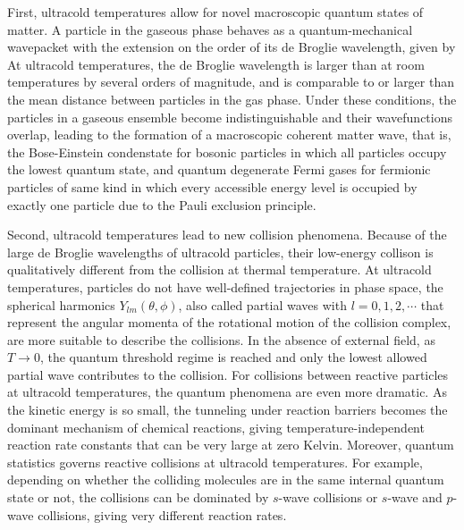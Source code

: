 First, ultracold temperatures allow for novel macroscopic quantum states of matter. A particle in the gaseous phase behaves as a quantum-mechanical 
wavepacket with the extension on the order of its de Broglie wavelength, given by
At ultracold temperatures, the de Broglie wavelength is larger than at room temperatures by several orders of magnitude, 
and is comparable to or larger than the mean distance between particles in the gas phase. Under these conditions,
the particles in a gaseous ensemble become indistinguishable and their wavefunctions overlap, leading to the formation of
a macroscopic coherent matter wave, that is, the Bose-Einstein condenstate\cite{ketterle2002, anglin2002} for bosonic 
particles in which all particles occupy the lowest quantum state, and quantum degenerate Fermi gases\cite{lev2002, stefano2008} for fermionic 
particles of same kind in which every accessible energy level is occupied by exactly one particle due to the Pauli exclusion principle. 

Second, ultracold temperatures lead to new collision phenomena.
Because of the large de Broglie wavelengths of ultracold particles, their low-energy collison is 
qualitatively different from the collision at thermal temperature. At ultracold temperatures, particles
do not have well-defined trajectories in phase space, the spherical harmonics $Y_{lm}(\theta, \phi)$, also called 
partial waves with $l = 0, 1, 2, \cdots$ that represent the angular momenta of the rotational motion of the collision complex,  are more suitable to describe the collisions. In the absence of external field, as $T 
\rightarrow 0$, the quantum threshold regime is reached and only the lowest allowed partial wave contributes to the 
collision\cite{wigner1948, krems2005}. For collisions between reactive particles at ultracold temperatures, the quantum phenomena are
even more dramatic. As the kinetic energy is so small, the tunneling under reaction barriers becomes the 
dominant mechanism of chemical reactions, giving temperature-independent reaction rate constants that 
can be very large at zero Kelvin\cite{balakrishnan2001, bodo2002, bodo2004, weck2004}. Moreover, quantum statistics 
governs reactive collisions at ultracold temperatures. For example, depending on 
whether the colliding molecules are in the same internal quantum state or not, the collisions can be dominated by 
$s$-wave collisions or $s$-wave and $p$-wave collisions, giving very different reaction rates\cite{ospelkaus2010}. 

